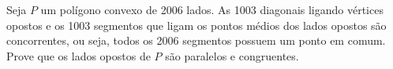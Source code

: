 Seja $P$ um polígono convexo de 2006 lados. As 1003 diagonais ligando vértices opostos e os 1003 segmentos que ligam os pontos médios dos lados opostos são concorrentes,  ou  seja,  todos  os  2006  segmentos  possuem  um  ponto  em  comum.  
Prove que os lados opostos de $P$ são paralelos e congruentes. 